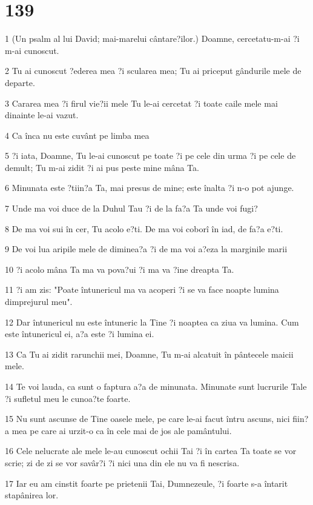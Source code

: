 \chapter{139}

\par 1 (Un psalm al lui David; mai-marelui cântare?ilor.) Doamne, cercetatu-m-ai ?i m-ai cunoscut.
\par 2 Tu ai cunoscut ?ederea mea ?i scularea mea; Tu ai priceput gândurile mele de departe.
\par 3 Cararea mea ?i firul vie?ii mele Tu le-ai cercetat ?i toate caile mele mai dinainte le-ai vazut.
\par 4 Ca înca nu este cuvânt pe limba mea
\par 5 ?i iata, Doamne, Tu le-ai cunoscut pe toate ?i pe cele din urma ?i pe cele de demult; Tu m-ai zidit ?i ai pus peste mine mâna Ta.
\par 6 Minunata este ?tiin?a Ta, mai presus de mine; este înalta ?i n-o pot ajunge.
\par 7 Unde ma voi duce de la Duhul Tau ?i de la fa?a Ta unde voi fugi?
\par 8 De ma voi sui în cer, Tu acolo e?ti. De ma voi coborî în iad, de fa?a e?ti.
\par 9 De voi lua aripile mele de diminea?a ?i de ma voi a?eza la marginile marii
\par 10 ?i acolo mâna Ta ma va pova?ui ?i ma va ?ine dreapta Ta.
\par 11 ?i am zis: "Poate întunericul ma va acoperi ?i se va face noapte lumina dimprejurul meu".
\par 12 Dar întunericul nu este întuneric la Tine ?i noaptea ca ziua va lumina. Cum este întunericul ei, a?a este ?i lumina ei.
\par 13 Ca Tu ai zidit rarunchii mei, Doamne, Tu m-ai alcatuit în pântecele maicii mele.
\par 14 Te voi lauda, ca sunt o faptura a?a de minunata. Minunate sunt lucrurile Tale ?i sufletul meu le cunoa?te foarte.
\par 15 Nu sunt ascunse de Tine oasele mele, pe care le-ai facut întru ascuns, nici fiin?a mea pe care ai urzit-o ca în cele mai de jos ale pamântului.
\par 16 Cele nelucrate ale mele le-au cunoscut ochii Tai ?i în cartea Ta toate se vor scrie; zi de zi se vor savâr?i ?i nici una din ele nu va fi nescrisa.
\par 17 Iar eu am cinstit foarte pe prietenii Tai, Dumnezeule, ?i foarte s-a întarit stapânirea lor.
